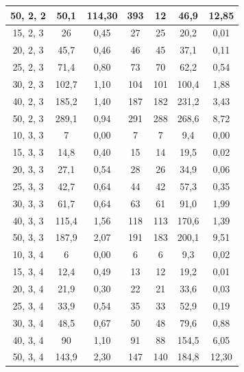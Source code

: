 \documentclass[12pt,a4paper]{article}
\begin{document}
\begin{center}
\begin{tabular}{|c|c|c|c|c|c|c|}
\hline
50, 2, 2	&	50,1	&	114,30	&	393	&	12	&	46,9	&	12,85	\\
\hline
15, 2, 3	&	26	&	0,45	&	27	&	25	&	20,2	&	0,01	\\
\hline
20, 2, 3	&	45,7	&	0,46	&	46	&	45	&	37,1	&	0,11	\\
\hline
25, 2, 3	&	71,4	&	0,80	&	73	&	70	&	62,2	&	0,54	\\
\hline
30, 2, 3	&	102,7	&	1,10	&	104	&	101	&	100,4	&	1,88	\\
\hline
40, 2, 3	&	185,2	&	1,40	&	187	&	182	&	231,2	&	3,43	\\
\hline
50, 2, 3	&	289,1	&	0,94	&	291	&	288	&	268,6	&	8,72	\\
\hline
10, 3, 3	&	7	&	0,00	&	7	&	7	&	9,4	&	0,00	\\
\hline
15, 3, 3	&	14,8	&	0,40	&	15	&	14	&	19,5	&	0,02	\\
\hline
20, 3, 3 	&	27,1	&	0,54	&	28	&	26	&	34,9	&	0,06	\\
\hline
25, 3, 3	&	42,7	&	0,64	&	44	&	42	&	57,3	&	0,35	\\
\hline
30, 3, 3	&	61,7	&	0,64	&	63	&	61	&	91,0	&	1,99	\\
\hline
40, 3, 3	&	115,4	&	1,56	&	118	&	113	&	170,6	&	1,39	\\
\hline
50, 3, 3	&	187,9	&	2,07	&	191	&	183	&	200,1	&	9,51	\\
\hline
10, 3, 4	&	6	&	0,00	&	6	&	6	&	9,3	&	0,02	\\
\hline
15, 3, 4	&	12,4	&	0,49	&	13	&	12	&	19,2	&	0,01	\\
\hline
20, 3, 4	&	21,9	&	0,30	&	22	&	21	&	33,6	&	0,03	\\
\hline
25, 3, 4	&	33,9	&	0,54	&	35	&	33	&	52,9	&	0,19	\\
\hline
30, 3, 4	&	48,5	&	0,67	&	50	&	48	&	79,6	&	0,88	\\
\hline
40, 3, 4	&	90	&	1,10	&	91	&	88	&	154,5	&	6,05	\\
\hline
50, 3, 4	&	143,9	&	2,30	&	147	&	140	&	184,8	&	12,30	\\
\hline
\end{tabular} 
\end{center}
\end{document}

